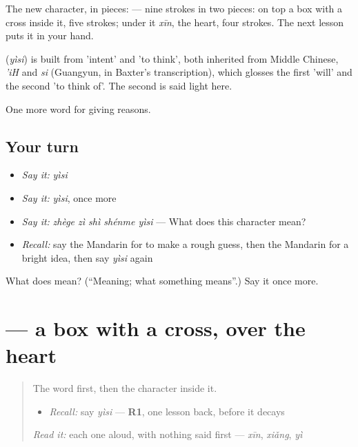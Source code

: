The new character, in pieces:  — nine strokes in two pieces: on top a box with a cross inside it, five strokes; under it  \emph{xīn}, the heart, four strokes. The next lesson puts it in your hand.

\begin{cousinweb}
\textbf{} (\emph{yìsi}) is built from  'intent' and  'to think', both inherited from Middle Chinese, \emph{'iH} and \emph{si} (Guangyun, in Baxter's transcription), which glosses the first 'will' and the second 'to think of'. The second is said light here.
\end{cousinweb}

\begin{grammarlens}[title={What you've built}]
One more word for giving reasons.
\end{grammarlens}

\subsection*{Your turn}
\begin{itemize}
\raggedright
  \item \emph{Say it:} \emph{yìsi}
  \item \emph{Say it:} \emph{yìsi}, once more
  \item \emph{Say it:} \emph{zhège zì shì shénme yìsi} — What does this character mean?
  \item \emph{Recall:} say the Mandarin for to make a rough guess, then the Mandarin for a bright idea, then say \emph{yìsi} again
\end{itemize}

\begin{tcolorbox}[breakable,colback=teal!4,colframe=teal!35!black,title={Before you move on}]
What does  mean? (\textquotedblleft{}Meaning; what something means\textquotedblright{}.) Say it once more.
\end{tcolorbox}
\section[\texorpdfstring{\zh{思} (sī)}{思 (sī)}]{ — a box with a cross, over the heart}

\label{lesson:ZH-W347-si-think}



\begin{quote}
The word first, then the character inside it.

\begin{itemize}
\raggedright
  \item \emph{Recall:} say \emph{yìsi} — \textbf{R1}, one lesson back, before it decays
\end{itemize}

\begin{quote}
  
\end{quote}

\emph{Read it:} each one aloud, with nothing said first — \emph{xīn}, \emph{xiǎng}, \emph{yì}
\end{quote}

